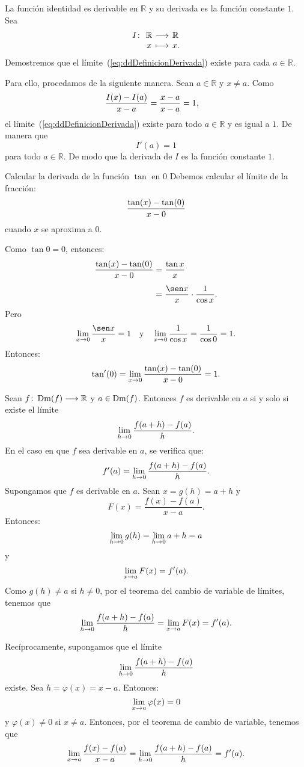 \begin{exemplo}[Solución]{%
La función identidad es derivable en $\mathbb{R}$ y su derivada es la función constante
$1$.
}%
Sea
\[
\funcionjc{I}{\mathbb{R}}{\mathbb{R}}{x}{x.}
\]
Demostremos que el límite~(\ref{eq:ddDefinicionDerivada}) existe para cada $a\in\mathbb{R}$.

Para ello, procedamos de la siguiente manera. Sean $a\in\mathbb{R}$ y $x\neq a$. Como
\begin{align*}
\razoncambio{I}{x}{a} &= \razoncambio{}{x}{a} = 1,
\end{align*}
el límite~(\ref{eq:ddDefinicionDerivada}) existe para todo $a\in\mathbb{R}$ y es igual a $1$. De
manera que
\[
I'(a) = 1
\]
para todo $a\in\mathbb{R}$. De modo que la derivada de $I$ es la función constante $1$.
\end{exemplo}

\begin{exemplo}[Solución]{%
Calcular la derivada de la función $\tan$ en $0$
}%
Debemos calcular el límite de la fracción:
\[
\razoncambio{\tan}{x}{0}
\]
cuando $x$ se aproxima a $0$.

Como $\tan 0 = 0$, entonces:
\begin{align*}
\razoncambio{\tan}{x}{0} &= \frac{\tan x}{x} \\[4pt]
  &= \frac{\sen x}{x}\cdot\frac{1}{\cos x}.
\end{align*}
Pero
\[
\limjc{\frac{\sen x}{x}}{x}{0} = 1 \yjc \limjc{\frac{1}{\cos x}}{x}{0} = \frac{1}{\cos 0} = 1.
\]
Entonces:
\[
\tan'(0) = \limjc{\razoncambio{\tan}{x}{0}}{x}{0} = 1.
\]
\end{exemplo}

\begin{exemplo}[Solución]{%
Sean $\funcjc{f}{\Dm(f)}{\mathbb{R}}$ y $a\in\Dm(f)$. Entonces $f$ es derivable en $a$ si y
solo si existe el límite
\[
\limjc{\frac{f(a + h) - f(a)}{h}}{h}{0}.
\]
En el caso en que $f$ sea derivable en $a$, se verifica que:
\[
f'(a) = \limjc{\frac{f(a + h) - f(a)}{h}}{h}{0}.
\]
}%
Supongamos que $f$ es derivable en $a$. Sean $x = g(h)=a + h$ y
\[
F(x) = \frac{f(x) - f(a)}{x - a}.
\]
Entonces:
\[
\limjc{g(h)}{h}{0} = \limjc{a + h}{h}{0} = a
\]
y
\[
\limjc{F(x)}{x}{a} = f'(a).
\]
Como $g(h) \neq a$ si $h\neq 0$, por el teorema del cambio de variable de límites, tenemos que
\[
\limjc{\frac{f(a + h) - f(a)}{h}}{h}{0} = \limjc{F(x)}{x}{a} = f'(a).
\]

Recíprocamente, supongamos que el límite
\begin{equation}
\label{eq:ddDefinicionAlternativa}
\limjc{\frac{f(a + h) - f(a)}{h}}{h}{0}
\end{equation}
existe. Sea $h = \varphi(x) = x - a$. Entonces:
\[
\limjc{\varphi(x)}{x}{a} = 0
\]
y $\varphi(x) \neq 0$ si $x \neq a$. Entonces, por el teorema de cambio de variable, tenemos que
\[
\limjc{\frac{f(x) - f(a)}{x - a}}{x}{a} = \limjc{\frac{f(a+h) - f(a)}{h}}{h}{0} = f'(a).
\]
\end{exemplo}

